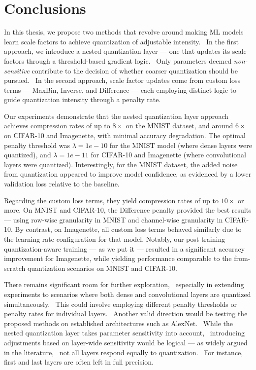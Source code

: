 \chapter{Conclusions}
\label{cha:chapter6}

\hspace*{1em}In this thesis, we propose two methods that revolve around 
making ML models learn scale factors to achieve quantization of adjustable intensity. \
In the first approach, 
we introduce a nested quantization layer — one that updates its scale factors through a threshold-based gradient logic. \
Only parameters deemed \textit{non-sensitive} contribute to the decision of whether coarser quantization should be pursued. \
In the second approach, scale factor updates come from custom loss terms —  
MaxBin, Inverse, and Difference — 
each employing distinct logic to guide quantization intensity through a penalty rate. \

Our experiments demonstrate that the nested quantization layer approach
achieves compression rates of up to \( 8 \times \) on the MNIST dataset, and around
\( 6 \times \) on CIFAR-10 and Imagenette, with minimal accuracy degradation.
The optimal penalty threshold was  \( \lambda = 1e-10 \) 
for the MNIST model (where dense layers were quantized),
and \( \lambda = 1e-11 \) 
for CIFAR-10 and Imagenette (where convolutional layers were quantized).
Interestingly, for the MNIST dataset, the added noise from quantization appeared to improve model confidence, 
as evidenced by a lower validation loss relative to the baseline.


Regarding the custom loss terms, they yield compression rates of up to \( 10 \times \) or more.
On MNIST and CIFAR-10, the Difference penalty provided the best results — using row-wise granularity in MNIST and channel-wise granularity in CIFAR-10.
By contrast, on Imagenette, all custom loss terms behaved similarly due to the learning-rate configuration for that model. 
Notably, our post-training quantization-aware training  —  as we put it — resulted in a significant accuracy improvement for Imagenette, 
while yielding performance comparable to the from-scratch quantization scenarios on MNIST and CIFAR-10.

There remains significant room for further exploration, \
especially in extending experiments 
to scenarios where both dense and convolutional layers are quantized simultaneously. \
This could involve employing different penalty thresholds or penalty rates for individual layers. \
Another valid direction would be testing the proposed methods on established architectures such as AlexNet. \
While the nested quantization layer takes parameter sensitivity into account, \
introducing adjustments based on layer-wide sensitivity would be logical — as widely argued in the literature, \
not all layers respond equally to quantization. \
For instance, first and last layers are often left in full precision. \

